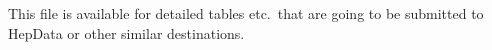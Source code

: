 This file is available for detailed tables etc.\ that are going to be
submitted to HepData or other similar destinations.